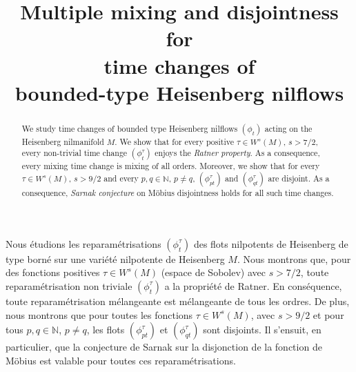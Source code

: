 \documentclass[JEP,XML,SOM,Unicode,NoEqCountersInSection]{cedram}
\theoremstyle{definition}
\theoremstyle{plain}
\begin{document}
\frontmatter

\title[Multiple mixing and disjointness for time changes of bounded-type Heisenberg nilflows]{Multiple mixing and disjointness for\\ time changes of\\ bounded-type Heisenberg nilflows}

\author[\initial{G.} \lastname{Forni}]{ }
\address{Department of Mathematics, University of Maryland\\
4176 Campus Drive -- William E. Kirwan Hall, College Park, MD 20742-4015, USA}

\author[\initial{A.} \lastname{Kanigowski}]{ }
\address{Department of Mathematics, University of Maryland\\
4176 Campus Drive -- William E. Kirwan Hall, College Park, MD 20742-4015, USA}

\begin{abstract}
We study time changes of bounded type Heisenberg nilflows $(\phi_t)$ acting on the Heisenberg nilmanifold $M$. We show that for every positive $\tau\in W^s(M)$, $s > 7/2$, every non-trivial time change $(\phi_t^{\tau})$ enjoys the \emph{Ratner property}. As a consequence, every mixing time change is mixing of all orders. Moreover, we show that for every $\tau\in W^s(M)$, $s>9/2$ and every $p,q\in \mathbb{N}$, $p\neq q$, $(\phi_{pt}^\tau)$ and $(\phi_{qt}^\tau)$ are disjoint. As a consequence, \emph{Sarnak conjecture} on Möbius disjointness holds for all such time changes.
\end{abstract}





\begin{altabstract}
Nous étudions les reparamétrisations $(\phi^\tau_t)$ des flots nilpotents de Heisenberg de type borné sur une variété nilpotente de Heisenberg $M$. Nous montrons que, pour des fonctions positives $\tau \in W^s (M)$ (espace de Sobolev) avec $s> 7/2$, toute reparamétrisation non triviale $(\phi^\tau_t)$ a la propriété de Ratner. En conséquence, toute reparamétrisation mélangeante est mélangeante de tous les ordres. De plus, nous montrons que pour toutes les fonctions $\tau \in W^s (M)$, avec $s> 9/2$ et pour tous $p, q \in\mathbb N$, $ p\neq q$, les flots $(\phi^\tau_{pt})$ et $(\phi^\tau_{qt})$ sont disjoints. Il s'ensuit, en particulier, que la conjecture de Sarnak sur la disjonction de la fonction de Möbius est valable pour toutes ces reparamétrisations.
\end{altabstract}
\end{document}
